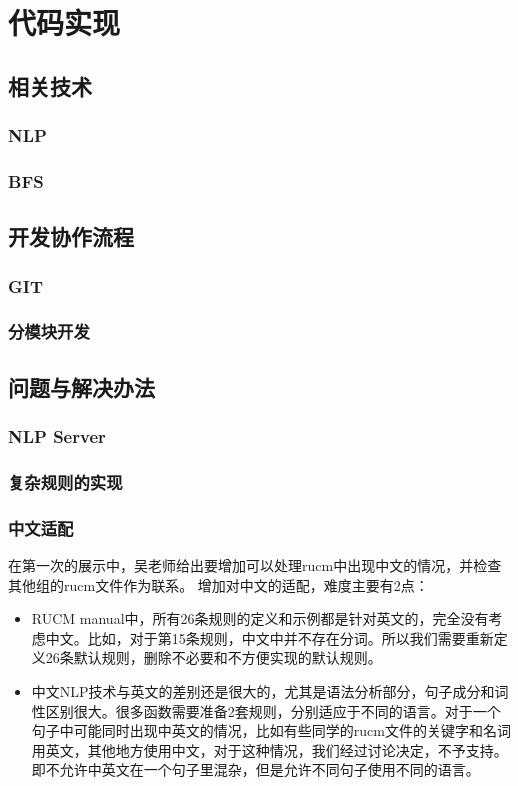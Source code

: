 \chapter{代码实现}

\section{相关技术}
    \subsection{NLP}
    \subsection{BFS}
\section{开发协作流程}
    \subsection{GIT}
    \subsection{分模块开发}
\section{问题与解决办法}
    \subsection{NLP Server}
    \subsection{复杂规则的实现}
    \subsection{中文适配}

    在第一次的展示中，吴老师给出要增加可以处理rucm中出现中文的情况，并检查其他组的rucm文件作为联系。
    增加对中文的适配，难度主要有2点：
    
    \begin{itemize}
        \item RUCM manual中，所有26条规则的定义和示例都是针对英文的，完全没有考虑中文。比如，对于第15条规则，中文中并不存在分词。所以我们需要重新定义26条默认规则，删除不必要和不方便实现的默认规则。
        \item 中文NLP技术与英文的差别还是很大的，尤其是语法分析部分，句子成分和词性区别很大。很多函数需要准备2套规则，分别适应于不同的语言。对于一个句子中可能同时出现中英文的情况，比如有些同学的rucm文件的关键字和名词用英文，其他地方使用中文，对于这种情况，我们经过讨论决定，不予支持。即不允许中英文在一个句子里混杂，但是允许不同句子使用不同的语言。
    \end{itemize}

